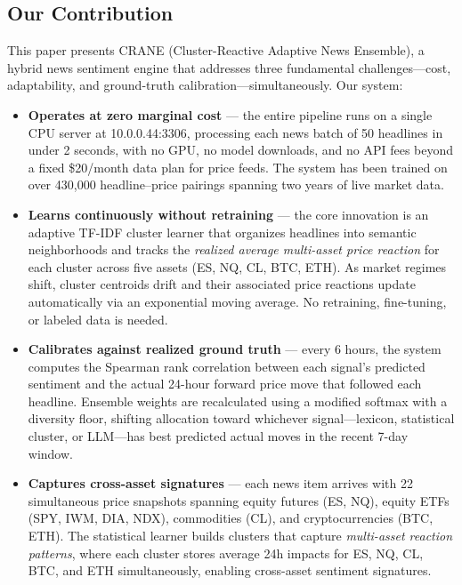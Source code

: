 \subsection{Our Contribution}

This paper presents CRANE (Cluster-Reactive Adaptive News Ensemble), a hybrid news sentiment engine that addresses three fundamental challenges---cost, adaptability, and ground-truth calibration---simultaneously. Our system:

\begin{itemize}
    \item \textbf{Operates at zero marginal cost} --- the entire pipeline runs on a single CPU server at 10.0.0.44:3306, processing each news batch of 50 headlines in under 2 seconds, with no GPU, no model downloads, and no API fees beyond a fixed \$20/month data plan for price feeds. The system has been trained on over 430,000 headline--price pairings spanning two years of live market data.

    \item \textbf{Learns continuously without retraining} --- the core innovation is an adaptive TF-IDF cluster learner that organizes headlines into semantic neighborhoods and tracks the \emph{realized average multi-asset price reaction} for each cluster across five assets (ES, NQ, CL, BTC, ETH). As market regimes shift, cluster centroids drift and their associated price reactions update automatically via an exponential moving average. No retraining, fine-tuning, or labeled data is needed.

    \item \textbf{Calibrates against realized ground truth} --- every 6 hours, the system computes the Spearman rank correlation between each signal's predicted sentiment and the actual 24-hour forward price move that followed each headline. Ensemble weights are recalculated using a modified softmax with a diversity floor, shifting allocation toward whichever signal---lexicon, statistical cluster, or LLM---has best predicted actual moves in the recent 7-day window.

    \item \textbf{Captures cross-asset signatures} --- each news item arrives with 22 simultaneous price snapshots spanning equity futures (ES, NQ), equity ETFs (SPY, IWM, DIA, NDX), commodities (CL), and cryptocurrencies (BTC, ETH). The statistical learner builds clusters that capture \emph{multi-asset reaction patterns}, where each cluster stores average 24h impacts for ES, NQ, CL, BTC, and ETH simultaneously, enabling cross-asset sentiment signatures.
\end{itemize}

